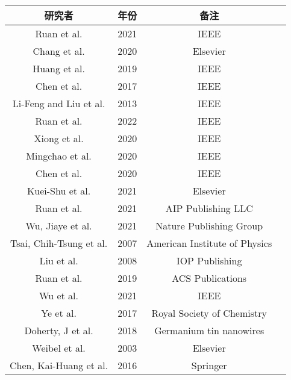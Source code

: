 \begin{center}
\begin{tabular}{cccc}
\hline
研究者 & 年份 & 备注 \\
\hline
Ruan et al. \cite{ruan2021enhanced} & 2021 & IEEE \\
Chang et al. \cite{chang2020low} & 2020 & Elsevier \\
Huang et al. \cite{huang2019high} & 2019 & IEEE \\
Chen et al. \cite{chen2017super} & 2017 & IEEE \\
Li-Feng and Liu et al. \cite{teng2013electrical} & 2013 & IEEE \\
Ruan et al. \cite{ruan2022performance} & 2022 & IEEE \\
Xiong et al. \cite{xiong2020investigation} & 2020 & IEEE \\
Mingchao et al. \cite{liu2020three} & 2020 & IEEE \\
Chen et al. \cite{chen2020advanced} & 2020 & IEEE \\
Kuei-Shu et al. \cite{ruan2021enhanced} & 2021 & Elsevier \\
Ruan et al. \cite{ruan2021improvement} & 2021 & AIP Publishing LLC \\
Wu, Jiaye et al. \cite{wu2021manipulation} & 2021 & Nature Publishing Group \\
Tsai, Chih-Tsung et al. \cite{tsai2007low} & 2007 & American Institute of Physics \\
Liu et al. \cite{liu2008improvement} & 2008 & IOP Publishing \\
Ruan et al. \cite{ruan2019performance} & 2019 & ACS Publications \\
Wu et al. \cite{wu2021improvement} & 2021 & IEEE \\
Ye et al. \cite{ye2017boosting} & 2017 & Royal Society of Chemistry \\
Doherty, J et al. \cite{doherty2018supercritical} & 2018 & Germanium tin nanowires\\
Weibel et al. \cite{weibel2003overview} & 2003 & Elsevier \\
Chen, Kai-Huang et al. \cite{chen2016improvement} & 2016 & Springer \\
\hline
\end{tabular}
\end{center}


